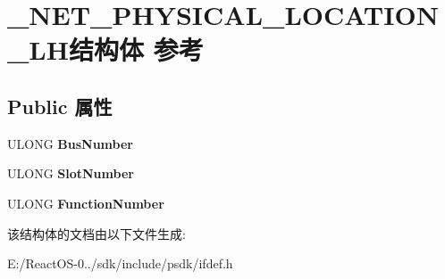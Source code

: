 \hypertarget{struct___n_e_t___p_h_y_s_i_c_a_l___l_o_c_a_t_i_o_n___l_h}{}\section{\+\_\+\+N\+E\+T\+\_\+\+P\+H\+Y\+S\+I\+C\+A\+L\+\_\+\+L\+O\+C\+A\+T\+I\+O\+N\+\_\+\+L\+H结构体 参考}
\label{struct___n_e_t___p_h_y_s_i_c_a_l___l_o_c_a_t_i_o_n___l_h}
\subsection*{Public 属性}
\begin{DoxyCompactItemize}
\item 
\mbox{\label{struct___n_e_t___p_h_y_s_i_c_a_l___l_o_c_a_t_i_o_n___l_h_a9b424ee8c24f132148c9671aa4c75265}} 
U\+L\+O\+NG {\bfseries Bus\+Number}
\item 
\mbox{\label{struct___n_e_t___p_h_y_s_i_c_a_l___l_o_c_a_t_i_o_n___l_h_a0912c1191e61990ef32574f77e8dbec6}} 
U\+L\+O\+NG {\bfseries Slot\+Number}
\item 
\mbox{\label{struct___n_e_t___p_h_y_s_i_c_a_l___l_o_c_a_t_i_o_n___l_h_ae74030ae28c2432e6c8f14c05a17dae5}} 
U\+L\+O\+NG {\bfseries Function\+Number}
\end{DoxyCompactItemize}


该结构体的文档由以下文件生成\+:\begin{DoxyCompactItemize}
\item 
E\+:/\+React\+O\+S-\/0../sdk/include/psdk/ifdef.\+h\end{DoxyCompactItemize}
